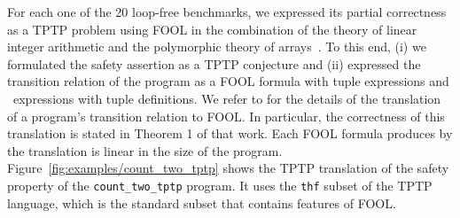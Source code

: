 For each one of the 20 loop-free benchmarks, we expressed its partial
correctness as a TPTP problem using FOOL in the combination of the  theory of
linear integer arithmetic and the polymorphic theory of
arrays~\cite{VampireAndFOOL}. To this end, (i) we formulated the
safety assertion as a TPTP conjecture and (ii) expressed the
transition relation of the program as a FOOL formula with tuple
expressions and \LETIN\ expressions with tuple definitions.
We refer to \cite{VampireAndFOOL} for the details of the translation of a program's transition relation to FOOL. In particular, the correctness of this translation is stated in Theorem 1 of that work. Each FOOL formula produces by the translation is linear in the size of the program. Figure~\ref{fig:examples/count_two_tptp} shows the TPTP translation of the safety property of the \verb'count_two_tptp' program. It uses the {\tt thf} subset of the TPTP language, which is the standard subset that contains features of FOOL.

%
%



